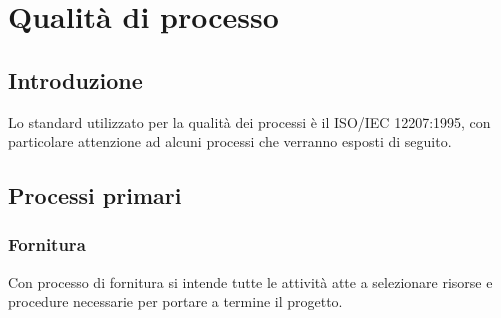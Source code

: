 \chapter{Qualità di processo}\label{qualita-di-processo}

\section{Introduzione}
Lo standard utilizzato per la qualità dei processi è il ISO/IEC 12207:1995, con particolare attenzione ad alcuni processi che verranno esposti di seguito.

\section{Processi primari}
\subsection{Fornitura}
Con processo di fornitura si intende tutte le attività atte a selezionare risorse e procedure necessarie per portare a termine il progetto. 

